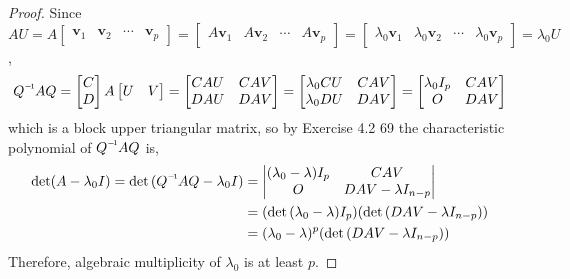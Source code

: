 \begin{proof}
	Since $AU = A\begin{bmatrix}
		\textbf{v}_1 & \textbf{v}_2 & \cdots & \textbf{v}_p
	\end{bmatrix} = \begin{bmatrix}
		A\textbf{v}_1 & A\textbf{v}_2 & \cdots & A\textbf{v}_p
	\end{bmatrix} = \begin{bmatrix}
		\lambda_0\textbf{v}_1 & \lambda_0\textbf{v}_2 & \cdots & \lambda_0\textbf{v}_p
	\end{bmatrix} = \lambda_0 U$, \begin{align*}
		\inv{Q}AQ = \begin{bmatrix}
			C \\ D
		\end{bmatrix}A\begin{bmatrix}
			U & V
		\end{bmatrix} = \begin{bmatrix}
			CAU & CAV \\ DAU & DAV
		\end{bmatrix} = \begin{bmatrix}
			\lambda_0 CU & CAV \\ \lambda_0 DU & DAV
		\end{bmatrix} = \begin{bmatrix}
			\lambda_0 I_p & CAV \\ O & DAV
		\end{bmatrix}
	\end{align*} which is a block upper triangular matrix, so by Exercise 4.2 69 the characteristic polynomial of $\inv{Q}AQ$ is, \begin{align*}
		\det(A - \lambda_0 I) = \det{(\inv{Q}AQ - \lambda_0 I)} &= \begin{vmatrix}
			(\lambda_0 - \lambda)I_p & CAV \\ O & DAV - \lambda I_{n-p}
		\end{vmatrix} \\
		&= (\det{(\lambda_0 - \lambda)I_p})(\det{(DAV - \lambda I_{n-p})}) \\
		&= (\lambda_0 - \lambda)^{p}(\det{(DAV - \lambda I_{n-p})})
	\end{align*}
	Therefore, algebraic multiplicity of $\lambda_0$ is at least $p$.
\end{proof}

